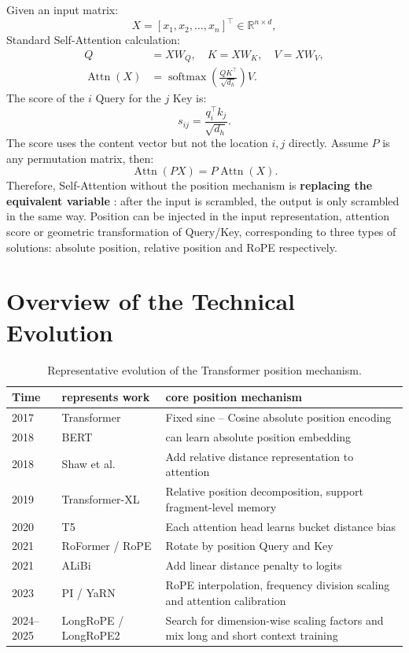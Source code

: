 \documentclass[UTF8,fontset=none,a4paper,10pt]{ctexart}
\newcommand{\term}[1]{\textbf{#1}}
\newcommand{\R}{\mathbb{R}}
\newcommand{\softmax}{\operatorname{softmax}}
\newcommand{\Attn}{\operatorname{Attn}}
\begin{document}
Given an input matrix:
\begin{equation}
  X=[x_1,x_2,\ldots,x_n]^\top\in\R^{n\times d},
  \label{en:eq:input}
\end{equation}
Standard Self-Attention calculation:
\begin{align}
  Q&=XW_Q,\quad K=XW_K,\quad V=XW_V, \label{en:eq:qkv}\\
  \Attn(X)&=\softmax\!\left(\frac{QK^\top}{\sqrt{d_h}}\right)V. \label{en:eq:attention}
\end{align}
The score of the $i$ Query for the $j$ Key is:
\begin{equation}
  s_{ij}=\frac{q_i^\top k_j}{\sqrt{d_h}}.
  \label{en:eq:score}
\end{equation}
The score uses the content vector but not the location $i,j$ directly. Assume $P$ is any permutation matrix, then:
\begin{equation}
  \Attn(PX)=P\Attn(X).
  \label{en:eq:permutation}
\end{equation}
Therefore, Self-Attention without the position mechanism is \term{ replacing the equivalent variable }: after the input is scrambled, the output is only scrambled in the same way. Position can be injected in the input representation, attention score or geometric transformation of Query/Key, corresponding to three types of solutions: absolute position, relative position and RoPE respectively.

\section{Overview of the Technical Evolution}

\begin{table}[htbp]
\centering
\small
\begin{tabularx}{\linewidth}{@{}p{1.2cm}p{3.5cm}X@{}}
\toprule
Time & represents work & core position mechanism \\
\midrule
2017 & Transformer & Fixed sine -- Cosine absolute position encoding \\
2018 & BERT & can learn absolute position embedding \\
2018 & Shaw et al. & Add relative distance representation to attention \\
2019 & Transformer-XL & Relative position decomposition, support fragment-level memory \\
2020 & T5 & Each attention head learns bucket distance bias \\
2021 & RoFormer / RoPE & Rotate by position Query and Key \\
2021 & ALiBi & Add linear distance penalty to logits \\
2023 & PI / YaRN & RoPE interpolation, frequency division scaling and attention calibration \\
2024--2025 & LongRoPE / LongRoPE2 & Search for dimension-wise scaling factors and mix long and short context training \\
\bottomrule
\end{tabularx}
\caption{Representative evolution of the Transformer position mechanism.}
\label{en:tab:timeline}
\end{table}
\end{document}
